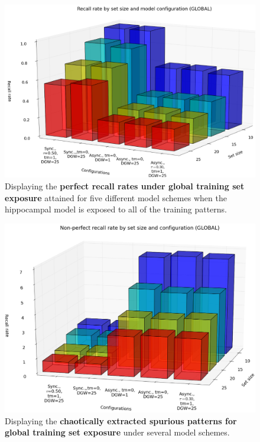\begin{figure}
    \centering
    \includegraphics[width=13cm]{fig/i-iters/global-recall}
    \caption{Displaying the \textbf{perfect recall rates under global training set exposure} attained for five different model schemes when the hippocampal model is exposed to all of the training patterns.}
    \label{fig:global-recall}
\end{figure}

\begin{figure}
    \centering
    \includegraphics[width=13cm]{fig/i-iters/global-spurious-recall}
    \caption{Displaying the \textbf{chaotically extracted spurious patterns for global training set exposure} under several model schemes.}
    \label{fig:global-recall-spurious}
\end{figure}

